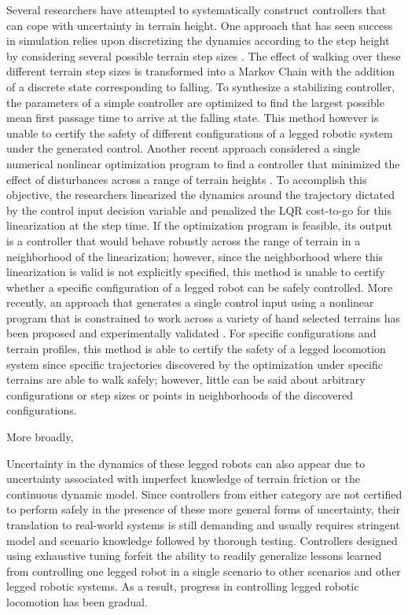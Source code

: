Several researchers have attempted to systematically construct controllers that can cope with uncertainty in terrain height. 
One approach that has seen success in simulation relies upon discretizing the dynamics according to the step height by considering several possible terrain step sizes \cite{byl2008metastable,saglam2013switching}. 
The effect of walking over these different terrain step sizes is transformed into a Markov Chain with the addition of a discrete state corresponding to falling.
To synthesize a stabilizing controller, the parameters of a simple controller are optimized to find the largest possible mean first passage time to arrive at the falling state. 
This method however is unable to certify the safety of different configurations of a legged robotic system under the generated control. 
Another recent approach considered a single numerical nonlinear optimization program to find a controller that minimized the effect of disturbances across a range of terrain heights \cite{dai2012optimizing}.
To accomplish this objective, the researchers linearized the dynamics around the trajectory dictated by the control input decision variable and penalized the LQR cost-to-go for this linearization at the step time. 
If the optimization program is feasible, its output is a controller that would behave robustly across the range of terrain in a neighborhood of the linearization; however, since the neighborhood where this linearization is valid is not explicitly specified, this method is unable to certify whether a specific configuration of a legged robot can be safely controlled.
More recently, an approach that generates a single control input using a nonlinear program that is constrained to work across a variety of hand selected terrains has been proposed and experimentally validated \cite{griffin2015}. 
For specific configurations and terrain profiles, this method is able to certify the safety of a legged locomotion system since specific trajectories discovered by the optimization under specific terrains are able to walk safely; however, little can be said about arbitrary configurations or step sizes or points in neighborhoods of the discovered configurations. 

More broadly, 

\vspace{1mm}
Uncertainty in the dynamics of these legged robots can also appear due to uncertainty associated with imperfect knowledge of terrain friction or the continuous dynamic model. 
Since controllers from either category are not certified to perform safely in the presence of these more general forms of uncertainty, their translation to real-world systems is still demanding and usually requires stringent model and scenario knowledge followed by thorough testing. 
Controllers designed using exhaustive tuning forfeit the ability to readily generalize lessons learned from controlling one legged robot in a single scenario to other scenarios and other legged robotic systems.
As a result, progress in controlling legged robotic locomotion has been gradual.

